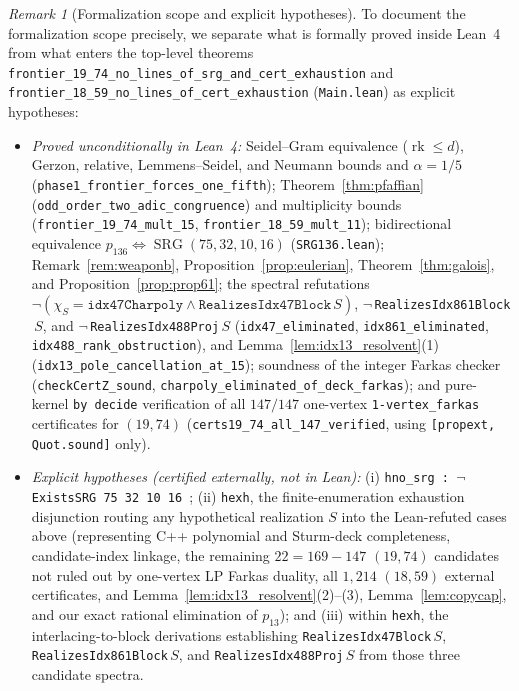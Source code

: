 \documentclass[11pt,reqno]{amsart}
\theoremstyle{definition}
\theoremstyle{remark}
\newtheorem{remark}[theorem]{Remark}
\DeclareMathOperator{\rk}{rk}
\DeclareMathOperator{\SRG}{SRG}
\begin{document}
\begin{remark}[Formalization scope and explicit hypotheses]\label{rem:lean_boundary}
To document the formalization scope precisely, we separate what is formally proved inside Lean~4 from what enters the top-level theorems \nolinkurl{frontier_19_74_no_lines_of_srg_and_cert_exhaustion} and \nolinkurl{frontier_18_59_no_lines_of_cert_exhaustion} (\nolinkurl{Main.lean}) as explicit hypotheses:
\begin{itemize}
  \item \emph{Proved unconditionally in Lean~4:} Seidel--Gram equivalence ($\rk \le d$), Gerzon, relative, Lemmens--Seidel, and Neumann bounds and $\alpha = 1/5$ (\nolinkurl{phase1_frontier_forces_one_fifth}); Theorem~\ref{thm:pfaffian} (\nolinkurl{odd_order_two_adic_congruence}) and multiplicity bounds (\nolinkurl{frontier_19_74_mult_15}, \nolinkurl{frontier_18_59_mult_11}); bidirectional equivalence $p_{136} \Leftrightarrow \SRG(75,32,10,16)$ (\nolinkurl{SRG136.lean}); Remark~\ref{rem:weaponb}, Proposition~\ref{prop:eulerian}, Theorem~\ref{thm:galois}, and Proposition~\ref{prop:prop61}; the spectral refutations $\neg(\chi_S = \texttt{idx47Charpoly} \wedge \texttt{RealizesIdx47Block}\,S)$, $\neg\,$\nolinkurl{RealizesIdx861Block}$\,S$, and $\neg\,$\nolinkurl{RealizesIdx488Proj}$\,S$ (\nolinkurl{idx47_eliminated}, \nolinkurl{idx861_eliminated}, \nolinkurl{idx488_rank_obstruction}), and Lemma~\ref{lem:idx13_resolvent}(1) (\nolinkurl{idx13_pole_cancellation_at_15}); soundness of the integer Farkas checker (\nolinkurl{checkCertZ_sound}, \nolinkurl{charpoly_eliminated_of_deck_farkas}); and pure-kernel \texttt{by decide} verification of all $147/147$ one-vertex \nolinkurl{1-vertex_farkas} certificates for $(19, 74)$ (\nolinkurl{certs19_74_all_147_verified}, using \texttt{[propext, Quot.sound]} only).
  \item \emph{Explicit hypotheses (certified externally, not in Lean):} (i) \texttt{hno\_srg : $\neg$\,ExistsSRG 75 32 10 16}~\cite{AzarijaMarc2018}; (ii) \texttt{hexh}, the finite-enumeration exhaustion disjunction routing any hypothetical realization $S$ into the Lean-refuted cases above (representing C++ polynomial and Sturm-deck completeness, candidate-index linkage, the remaining $22 = 169 - 147$ $(19, 74)$ candidates not ruled out by one-vertex LP Farkas duality, all $1{,}214$ $(18, 59)$ external certificates, and Lemma~\ref{lem:idx13_resolvent}(2)--(3), Lemma~\ref{lem:copycap}, and our exact rational elimination of $p_{13}$); and (iii) within \texttt{hexh}, the interlacing-to-block derivations establishing \nolinkurl{RealizesIdx47Block}\,$S$, \nolinkurl{RealizesIdx861Block}\,$S$, and \nolinkurl{RealizesIdx488Proj}\,$S$ from those three candidate spectra.
\end{itemize}
\end{remark}
\end{document}
